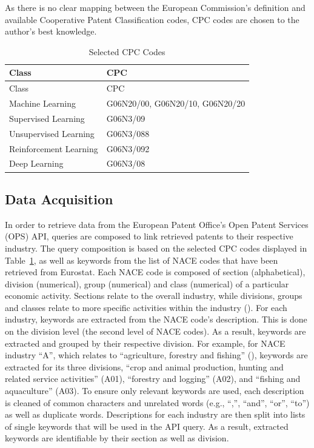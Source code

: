 \documentclass[
  12pt,
  a4paperpaper,
]{article}
\begin{document}
As there is no clear mapping between the European Commission's
definition and available Cooperative Patent Classification codes, CPC
codes are chosen to the author's best knowledge.


\label{tbl-cpc-codes}
\begin{longtable}[]{@{}ll@{}}
\caption{\label{tbl-cpc-codes}Selected CPC Codes}\tabularnewline
\toprule\noalign{}
Class & CPC \\
\midrule\noalign{}
\endfirsthead
\toprule\noalign{}
Class & CPC \\
\midrule\noalign{}
\endhead
\bottomrule\noalign{}
\endlastfoot
Machine Learning & G06N20/00, G06N20/10, G06N20/20 \\
Supervised Learning & G06N3/09 \\
Unsupervised Learning & G06N3/088 \\
Reinforcement Learning & G06N3/092 \\
Deep Learning & G06N3/08 \\
\end{longtable}


\subsection{Data Acquisition}\label{sec-data-acquisition}

In order to retrieve data from the European Patent Office's Open Patent
Services (OPS) API, queries are composed to link retrieved patents to
their respective industry. The query composition is based on the
selected CPC codes displayed in Table~\ref{tbl-cpc-codes}, as well as
keywords from the list of NACE codes that have been retrieved from
Eurostat. Each NACE code is composed of section (alphabetical), division
(numerical), group (numerical) and class (numerical) of a particular
economic activity. Sections relate to the overall industry, while
divisions, groups and classes relate to more specific activities within
the industry (). For
each industry, keywords are extracted from the NACE code's description.
This is done on the division level (the second level of NACE codes). As
a result, keywords are extracted and grouped by their respective
division. For example, for NACE industry ``A'', which relates to
``agriculture, forestry and fishing''
(), keywords are extracted for its three
divisions, ``crop and animal production, hunting and related service
activities'' (A01), ``forestry and logging'' (A02), and ``fishing and
aquaculture'' (A03). To ensure only relevant keywords are used, each
description is cleaned of common characters and unrelated words (e.g.,
``,'', ``and'', ``or'', ``to'') as well as duplicate words. Descriptions
for each industry are then split into lists of single keywords that will
be used in the API query. As a result, extracted keywords are
identifiable by their section as well as division.
\end{document}
